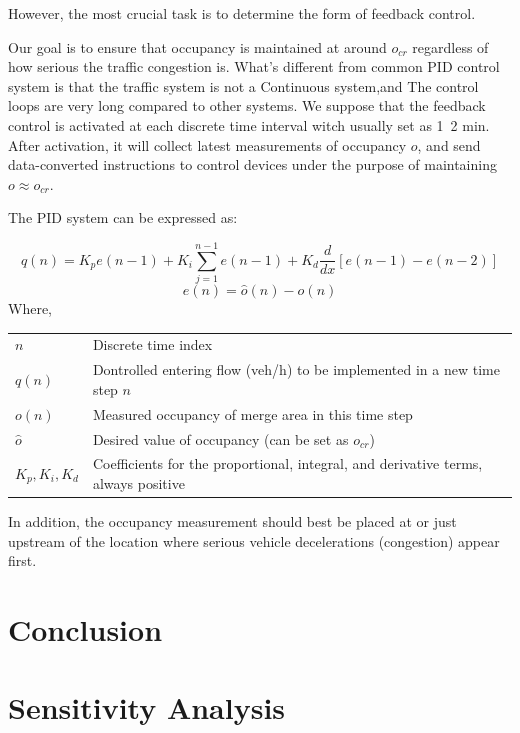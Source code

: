 \documentclass{mcmthesis}
\begin{document}
However, the most crucial task is to determine the
form of feedback control.

Our goal is to ensure that occupancy is maintained
at around $o_{cr}$ regardless of how serious the traffic congestion is.
What's different from common PID control system is that the traffic
system is not a Continuous system,and
The control loops are very long compared to other systems.
We suppose that the feedback control is activated
at each discrete time interval witch usually set as 1~2 min. After activation, it
will collect latest measurements of occupancy $o$, and
send data-converted instructions to control devices
under the purpose of maintaining $o  \approx  o_{cr}$.


The PID system can be expressed as:

  \[q\left( n \right) = K_{p}e\left( {n - 1} \right) + {K_i}\sum_{j=1}^{n-1} e\left( {n - 1} \right)+K_{d}\frac{d}{dx} \left[ e\left( {n - 1} \right)-e\left( {n - 2} \right)\right]
  \]
  \[
  e\left( {n} \right)=\hat{o}\left( {n} \right)-o\left( {n} \right)
  \]
Where,

\begin{table}[htbp]
  \centering
    \begin{tabular}{ll}
      \toprule
    $n$     & Discrete time index \\
    $q(n)$  & Dontrolled entering flow (veh/h) to be implemented in a new time step $n$ \\

    $o(n)$ & Measured occupancy of merge area in this time step \\
    $\hat{o}$ & Desired value of occupancy (can be set as $o_{cr}$) \\
    $K_{p},K_i,K_d$  & Coefficients for the proportional, integral, and derivative terms, always positive \\
    \bottomrule
    \end{tabular}%
  \label{tab:addlabel}%
\end{table}%

In addition, the occupancy measurement should best be
placed at or just upstream of the location where serious
vehicle decelerations (congestion) appear first.

\section{Conclusion}

\section{Sensitivity Analysis}
\end{document}
